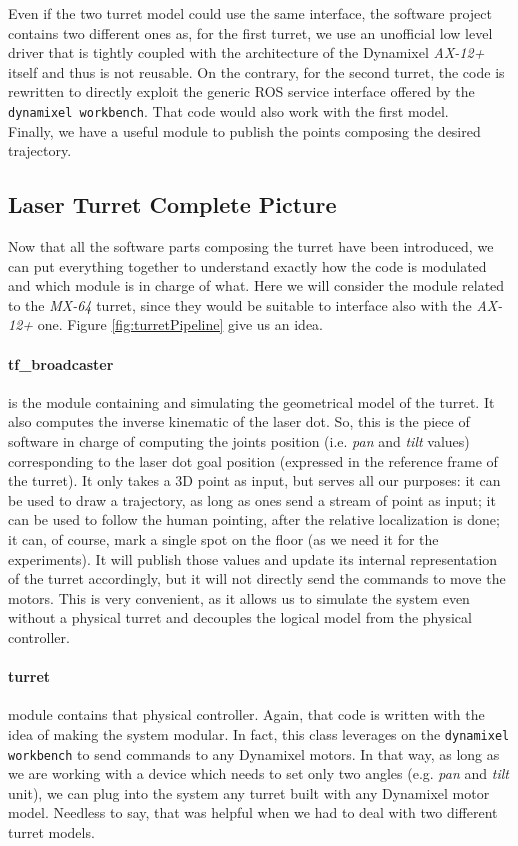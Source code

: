 Even if the two turret model could use the same interface, the software project contains two different ones as, for the first turret, we use an unofficial low level driver that is tightly coupled with the architecture of the Dynamixel \emph{AX-12+} itself and thus is not reusable. On the contrary, for the second turret, the code is rewritten to directly exploit the generic \ac{ROS} service interface offered by the \texttt{dynamixel workbench}. That code would also work with the first model.\\
Finally, we have a useful module to publish the points composing the desired trajectory.

\subsection{Laser Turret Complete Picture}
Now that all the software parts composing the turret have been introduced, we can put everything together to understand exactly how the code is modulated and which module is in charge of what. Here we will consider the module related to the \emph{MX-64} turret, since they would be suitable to interface also with the \emph{AX-12+} one. Figure \ref{fig:turretPipeline} give us an idea.
\paragraph{tf\_broadcaster} is the module containing and simulating the geometrical model of the turret. It also computes the inverse kinematic of the laser dot. So, this is the piece of software in charge of computing the joints position (i.e. \emph{pan} and \emph{tilt} values) corresponding to the laser dot goal position (expressed in the reference frame of the turret). It only takes a 3D point as input, but serves all our purposes: it can be used to draw a trajectory, as long as ones send a stream of point as input; it can be used to follow the human pointing, after the relative localization is done; it can, of course, mark a single spot on the floor (as we need it for the experiments).
It will publish those values and update its internal representation of the turret accordingly, but it will not directly send the commands to move the motors. This is very convenient, as it allows us to simulate the system even without a physical turret and decouples the logical model from the physical controller.
\paragraph{turret} module contains that physical controller. Again, that code is written with the idea of making the system modular. In fact, this class leverages on the \texttt{dynamixel workbench} to send commands to any Dynamixel motors. In that way, as long as we are working with a device which needs to set only two angles (e.g. \emph{pan} and \emph{tilt} unit), we can plug into the system any turret built with any Dynamixel motor model. Needless to say, that was helpful when we had to deal with two different turret models.

